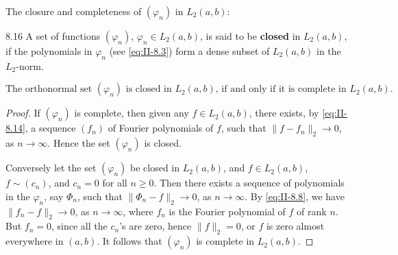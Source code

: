 The closure and completeness of $(\varphi_{n})$ in $L_{2}(a,b)$:
\begin{nstmt}{8.16}\label{eq:II-8.16}
A set of functions $(\varphi_{n})$, $\varphi_{n}\in L_{2}(a,b)$, is said to be \textbf{closed} in $L_{2}(a,b)$, if the polynomials in $\varphi_{n}$ (see \eqref{eq:II-8.3}) form a dense subset of $L_{2}(a,b)$ in the $L_{2}$-norm.
\end{nstmt}
\begin{equation*}\tag{8.17}\label{eq:II-8.17}
\text{The orthonormal set $(\varphi_{n})$ is closed in $L_{2}(a,b)$, if and only if it is complete in $L_{2}(a,b)$.}
\end{equation*}
\begin{proof}
If $(\varphi_{n})$ is complete, then given any $f\in L_{2}(a,b)$, there exists, by \eqref{eq:II-8.14}, a sequence $(f_{n})$ of Fourier polynomials of $f$, such that $\|f-f_{n}\|_{2}\to 0$, as $n\to\infty$. Hence the set $(\varphi_{n})$ is closed.

Conversely let the set $(\varphi_{n})$ be closed in $L_{2}(a,b)$, and $f\in L_{2}(a,b)$, $f\sim(c_{n})$, and $c_{n}=0$ for all $n\ge 0$. Then there exists a sequence of polynomials in the $\varphi_{n}$, say $\Phi_{n}$, such that $\|\Phi_{n}-f\|_{2}\to 0$, as $n\to\infty$. By \eqref{eq:II-8.8}, we have $\|f_{n}-f\|_{2}\to 0$, as $n\to\infty$, where $f_{n}$ is the Fourier polynomial of $f$ of rank $n$. But $f_{n}=0$, since all the $c_{n}$'s are zero, hence $\|f\|_{2}=0$, or $f$ is zero almost everywhere in $(a,b)$. It follows that $(\varphi_{n})$ is complete in $L_{2}(a,b)$.
\end{proof}

